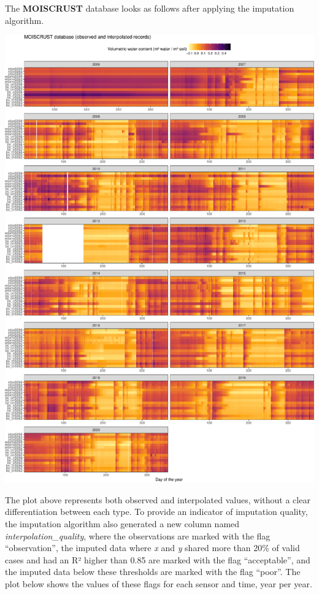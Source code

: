 \documentclass[]{article}
\begin{document}
The \textbf{MOISCRUST} database looks as follows after applying the
imputation algorithm.

\includegraphics{moiscrust_files/figure-latex/unnamed-chunk-29-1.pdf}

The plot above represents both observed and interpolated values, without
a clear differentiation between each type. To provide an indicator of
imputation quality, the imputation algorithm also generated a new column
named \emph{interpolation\_quality}, where the observations are marked
with the flag ``observation'', the imputed data where \emph{x} and
\emph{y} shared more than 20\% of valid cases and had an R² higher than
0.85 are marked with the flag ``acceptable'', and the imputed data below
these thresholds are marked with the flag ``poor''. The plot below shows
the values of these flags for each sensor and time, year per year.
\end{document}
